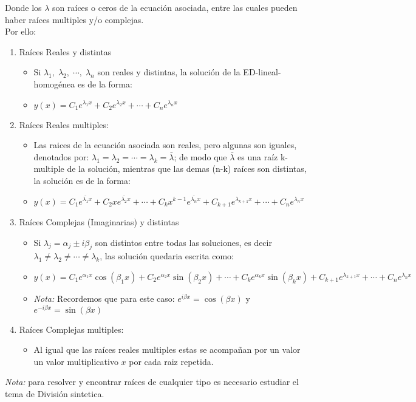 Donde los \(\displaystyle \lambda\) son raíces o ceros de la ecuación asociada, entre las cuales pueden haber raíces multiples y/o complejas.\\
Por ello:
\begin{enumerate}
  \item Raíces Reales y distintas
  \begin{itemize}
    \item Si \(\displaystyle \lambda_{1},\;\lambda_{2},\;\cdots,\;\lambda_{n}\) son reales y distintas, la solución de la ED-lineal-homogénea es de la forma:
    \item \(\displaystyle y(x)=C_{1}e^{\lambda_{1}x}+C_{2}e^{\lambda_{2}x}+\cdots+C_{n}e^{\lambda_{n}x}\)
  \end{itemize}
  \item Raíces Reales multiples:
  \begin{itemize}
    \item Las raices de la ecuación asociada son reales, pero algunas son iguales, denotados por: \(\displaystyle \lambda_{1}=\lambda_{2}=\cdots=\lambda_{k}=\bar{\lambda}\); de modo que \(\displaystyle \bar{\lambda}\) es una raíz k-multiple de la solución, mientras que las demas (n-k) raíces son distintas, la solución es de la forma:
    \item \(\displaystyle y(x)=C_{1}e^{\bar{\lambda_{1}}x}+C_{2}xe^{\bar{\lambda_{2}}x}+\cdots+C_{k}x^{k-1}e^{\bar{\lambda_{n}}x}+C_{k+1}e^{\lambda_{k+1}x}+\cdots+C_{n}e^{\lambda_{n}x}\)
  \end{itemize}
  \item Raíces Complejas (Imaginarias) y distintas
  \begin{itemize}
    \item Si \(\displaystyle \lambda_{j}=\alpha_{j}\pm i\beta_{j}\) son distintos entre todas las soluciones, es decir  \(\displaystyle\lambda_{1}\neq\lambda_{2}\neq\cdots\neq\lambda_{k}\), las solución quedaria escrita como:
    \item \(\displaystyle y(x)=C_{1}e^{\alpha_{1}x}\cos\left(\beta_{1}x\right)+C_{2}e^{\alpha_{2}x}\sin\left(\beta_{2}x\right) + \cdots + C_{k}e^{\alpha_{k}x}\sin\left(\beta_{k}x\right)+C_{k+1}e^{\lambda_{k+1}x}+\cdots+C_{n}e^{\lambda_{n}x}\)
    \item \textit{Nota:} Recordemos que para este caso: \(\displaystyle e^{i\beta x}=\cos\left(\beta x\right)\) y \(\displaystyle e^{-i\beta x}=\sin\left(\beta x\right)\)
  \end{itemize}
  \item Raíces Complejas multiples:
  \begin{itemize}
    \item Al igual que las raíces reales multiples estas se acompañan por un valor un valor multiplicativo \(\displaystyle x\) por cada raiz repetida.
  \end{itemize}
\end{enumerate}
\textit{Nota:} para resolver y encontrar raíces de cualquier tipo es necesario estudiar el tema de División sintetica.
\printindex

